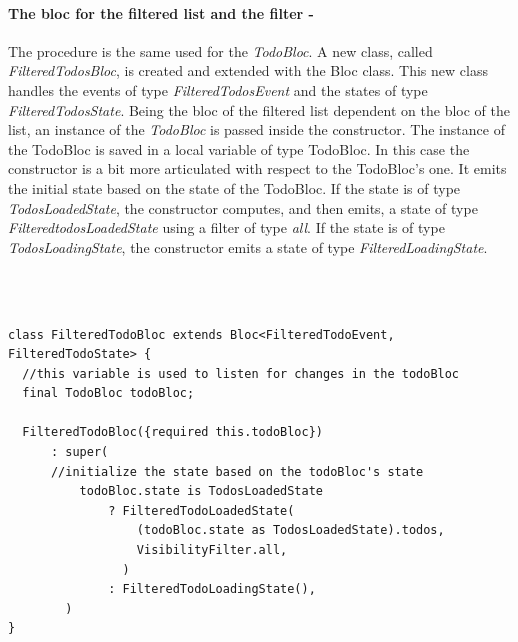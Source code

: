 \paragraph{The bloc for the filtered list and the filter - }
\label{subpar:todo_app_bloc_core_state}
The procedure is the same used for the \textit{TodoBloc}. A new class, called \textit{FilteredTodosBloc}, is created and extended with the Bloc class. This new class handles the events of type \textit{FilteredTodosEvent} and the states of type \textit{FilteredTodosState}. Being the bloc of the filtered list dependent on the bloc of the list, an instance of the \textit{TodoBloc} is passed inside the constructor. The instance of the TodoBloc is saved in a local variable of type TodoBloc. In this case the constructor is a bit more articulated with respect to the TodoBloc's one. It emits the initial state based on the state of the TodoBloc. If the state is of type \textit{TodosLoadedState},  the constructor computes, and then emits,  a state of type \textit{FilteredtodosLoadedState} using a filter of type \textit{all}. If the state is of type \textit{TodosLoadingState}, the constructor emits a state of type \textit{FilteredLoadingState}.
\begin{code}
\mbox{}\\
 \mbox{}
\label{code:2.14}
\begin{verbatim}

class FilteredTodoBloc extends Bloc<FilteredTodoEvent, FilteredTodoState> {
  //this variable is used to listen for changes in the todoBloc
  final TodoBloc todoBloc;

  FilteredTodoBloc({required this.todoBloc})
      : super(
      //initialize the state based on the todoBloc's state
          todoBloc.state is TodosLoadedState
              ? FilteredTodoLoadedState(
                  (todoBloc.state as TodosLoadedState).todos,
                  VisibilityFilter.all,
                )
              : FilteredTodoLoadingState(),
        )  
}
\end{verbatim}
\mbox{}
\end{code}

